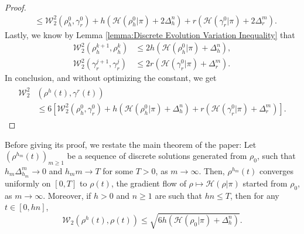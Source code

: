 \documentclass[final,12pt]{colt2018}
\newcommand{\was}{\mathcal{W}}
\newenvironment{customthm}[1]
  {\renewcommand\theinnercustomthm{#1}\innercustomthm}
  {\endinnercustomthm}
\begin{document}
\begin{proof}
\begin{align}
&\leq \was_2^2(\rho_{h}^0, \gamma_{r}^0) + {h}\left(\mathcal{H}(\rho_{h}^{0} | \pi) + 2\Delta_{h}^{n}\right) + {r}\left(\mathcal{H}(\gamma_{r}^{0} | \pi) + 2\Delta_{r}^{m}\right).
\end{align}
Lastly, we know by Lemma \ref{lemma:Discrete Evolution Variation Inequality} that
\begin{align}
\was_2^2(\rho_{h}^{k+1},\rho_{h}^{k}) &\leq  2{h}\left(\mathcal{H}(\rho_{h}^{0}| \pi)  + \Delta_{h}^{n}\right),\\
\was_2^2(\gamma_{r}^{j+1},\gamma_{r}^{j}) &\leq  2{r}\left(\mathcal{H}(\gamma_{r}^{0}| \pi)  + \Delta_{r}^{m}\right).
\end{align}
In conclusion, and without optimizing the constant, we get
\begin{align}
\begin{split}
\was^2_2 &(\rho^{h}(t), \gamma^{r}(t)) \\
& \leq 6\left[\was_2^2(\rho_{h}^0, \gamma_{r}^0) + {h}\left(\mathcal{H}(\rho_{h}^{0} | \pi) + \Delta_{h}^{n}\right) + {r}\left(\mathcal{H}(\gamma_{r}^{0} | \pi) + \Delta_{r}^{m}\right)  \right].
\end{split}
\end{align}
\end{proof}

Before giving its proof, we restate the main theorem of the paper:
\begin{customthm}{1}
Let $(\rho^{h_m}(t))_{m\geq1}$ be a sequence of discrete solutions generated from $\rho_0$, such that $h_m\Delta_{h_m}^m \to 0$ and $h_m m \to T$ for some $T >0$, as $m \to \infty$. Then, $\rho^{h_m}(t)$ converges uniformly on $[0,T]$ to $\rho(t)$, the gradient flow of $\rho\mapsto\mathcal{H}(\rho | \pi)$ started from $\rho_0$, as $m\to \infty$. Moreover, if $h >0$ and $n\geq 1$ are such that $hn \leq T$, then for any $t \in [0,hn]$, 
\begin{equation}
\was_2 (\rho^{h}(t), \rho(t)) \leq \sqrt{6h \left(\mathcal{H}(\rho_{0} | \pi) + \Delta_{h}^{n}\right)}.
\end{equation}
\end{customthm}
\end{document}
